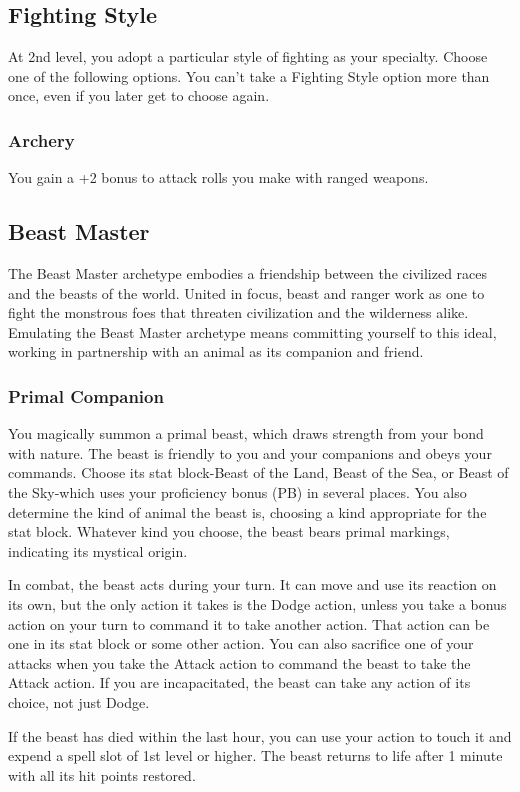 {\subsection*{Fighting Style}
At 2nd level, you adopt a particular style of fighting as your specialty. Choose one of the following options. You can't take a Fighting Style option more than once, even if you later get to choose again.
\subsubsection*{Archery}
You gain a +2 bonus to attack rolls you make with ranged weapons.
\subsection*{Beast Master}
The Beast Master archetype embodies a friendship between the civilized races and the beasts of the world. United in focus, beast and ranger work as one to fight the monstrous foes that threaten civilization and the wilderness alike. Emulating the Beast Master archetype means committing yourself to this ideal, working in partnership with an animal as its companion and friend.
\subsubsection*{Primal Companion}
You magically summon a primal beast, which draws strength from your bond with nature. The beast is friendly to you and your companions and obeys your commands. Choose its stat block-Beast of the Land, Beast of the Sea, or Beast of the Sky-which uses your proficiency bonus (PB) in several places. You also determine the kind of animal the beast is, choosing a kind appropriate for the stat block. Whatever kind you choose, the beast bears primal markings, indicating its mystical origin.

In combat, the beast acts during your turn. It can move and use its reaction on its own, but the only action it takes is the Dodge action, unless you take a bonus action on your turn to command it to take another action. That action can be one in its stat block or some other action. You can also sacrifice one of your attacks when you take the Attack action to command the beast to take the Attack action. If you are incapacitated, the beast can take any action of its choice, not just Dodge.

If the beast has died within the last hour, you can use your action to touch it and expend a spell slot of 1st level or higher. The beast returns to life after 1 minute with all its hit points restored. 

}
